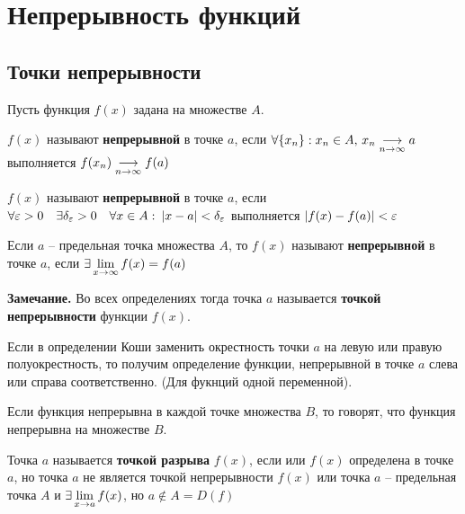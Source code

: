 \section{Непрерывность функций}

\subsection{Точки непрерывности}

Пусть функция $f(x)$ задана на множестве $A$.

\begin{definition}[Гейне]
    $f(x)$ называют \textbf{непрерывной} в точке $a$, если
    $\forall \{ x_n \}: x_n \in A,\, x_n \underset{n \to \infty}{\longrightarrow} a$
    выполняется $f(x_n) \underset{n \to \infty}{\longrightarrow} f(a)$
\end{definition}

\begin{definition}[Коши]
    $f(x)$ называют \textbf{непрерывной} в точке $a$, если
    $\forall \varepsilon > 0 \quad \exists \delta_\varepsilon > 0 \quad
    \forall x \in A: \: |x - a| < \delta_\varepsilon$ выполняется
    $|f(x) - f(a)| < \varepsilon$
\end{definition}

\begin{definition}
    Если $a$ -- предельная точка множества $A$, то $f(x)$ называют \textbf{непрерывной}
    в точке $a$, если $\exists \displaystyle\lim_{x \to \infty} f(x) = f(a)$
\end{definition}

\textbf{Замечание.} Во всех определениях тогда точка $a$ называется \textbf{точкой непрерывности}
функции $f(x)$.

Если в определении Коши заменить окрестность точки $a$ на левую или правую полуокрестность,
то получим определение функции, непрерывной в точке $a$ слева или справа соответственно.
(Для фукнций одной переменной).

\begin{definition}
    Если функция непрерывна в каждой точке множества $B$, 
    то говорят, что функция непрерывна на множестве $B$.
\end{definition}

\begin{definition}
    Точка $a$ называется \textbf{точкой разрыва} $f(x)$, если или $f(x)$ определена
    в точке $a$, но точка $a$ не является точкой непрерывности $f(x)$ или точка $a$ --
    предельная точка $A$ и $\exists \displaystyle\lim_{x \to a} f(x)$, но $a \notin A = D(f)$
\end{definition}

